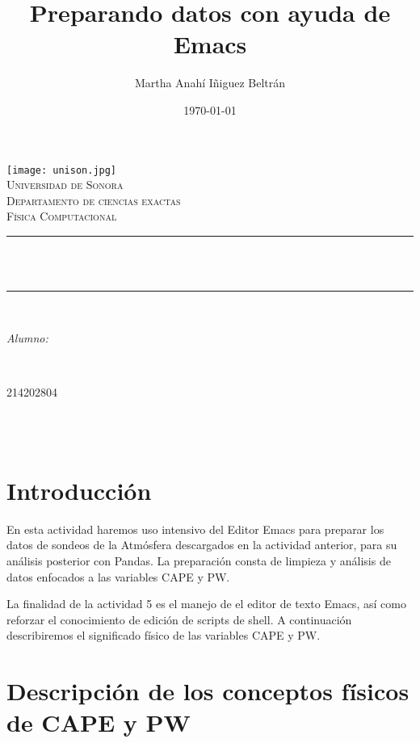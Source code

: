 \documentclass[12pt]{article}
\title{Preparando datos con ayuda de Emacs}								%
\author{Martha Anahí Iñiguez Beltrán}						%
\date{\today}											%
\makeatletter
\let\thetitle\@title
\let\theauthor\@author
\let\thedate\@date
\makeatother
\begin{document}
\begin{titlepage}
\centering
    \vspace*{0.5 cm}
    \texttt{[image: unison.jpg]}\\[1.0 cm]	%
    \textsc{\LARGE Universidad de Sonora}\\[2.0 cm]	%
    \textsc{\Large Departamento de ciencias exactas}\\[1.0 cm]
\textsc{\Large Física Computacional}\\[0.5 cm]
\rule{\linewidth}{0.2 mm} \\[0.4 cm]
{ \huge \bfseries \thetitle}\\
\rule{\linewidth}{0.2 mm} \\[1.5 cm]
\begin{minipage}{0.6\textwidth}
\begin{flushleft} \large
\emph{Alumno:}\\
\theauthor
\end{flushleft}
\end{minipage}~
\begin{minipage}{0.4\textwidth}
\begin{flushright} \large
214202804
\end{flushright}
\end{minipage}\\[2 cm]


{\large \thedate}\\[2 cm]

\vfill

\end{titlepage}

\tableofcontents
\pagebreak

\section{Introducción}

En esta actividad haremos uso intensivo del Editor Emacs para preparar los datos de sondeos de la Atmósfera descargados en la actividad anterior,  para su análisis posterior con Pandas. La preparación consta de limpieza y análisis de datos enfocados a las variables CAPE y PW.

La finalidad de la actividad 5 es el manejo de el editor de texto Emacs, así como reforzar el conocimiento de edición de scripts de shell. A continuación describiremos el significado físico de las variables CAPE y PW.

\section{Descripción de los conceptos físicos de CAPE y PW}
\end{document}
